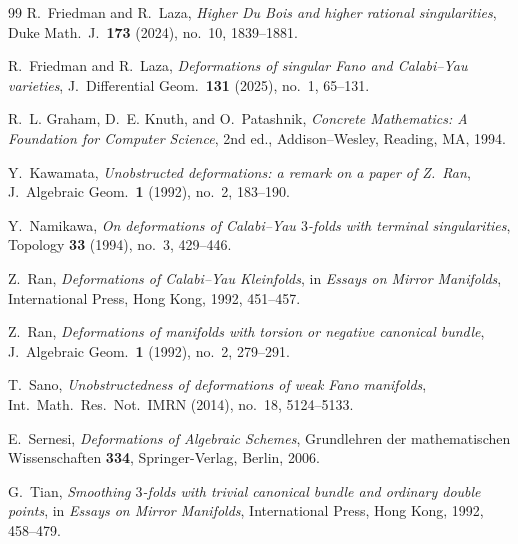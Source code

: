 \documentclass[11pt]{amsart}
\numberwithin{equation}{section}
\theoremstyle{plain}
\theoremstyle{definition}
\newcommand{\0}{$0$-mutable}
\renewcommand{\1}{$1$-rigid}
\renewcommand{\0}{$0$-mutable}
\begin{document}
\begin{thebibliography}{99}
R.~Friedman and R.~Laza,
\emph{Higher Du Bois and higher rational singularities},
Duke Math.\ J.\ \textbf{173} (2024), no.~10, 1839--1881.

R.~Friedman and R.~Laza,
\emph{Deformations of singular Fano and Calabi--Yau varieties},
J.\ Differential Geom.\ \textbf{131} (2025), no.~1, 65--131.

{R.~L. Graham, D.~E. Knuth, and O.~Patashnik,
\emph{Concrete Mathematics: A Foundation for Computer Science},
2nd ed., Addison--Wesley, Reading, MA, 1994.}

Y.~Kawamata,
\emph{Unobstructed deformations: a remark on a paper of Z.~Ran},
J.\ Algebraic Geom.\ \textbf{1} (1992), no.~2, 183--190.






Y.~Namikawa,
\emph{On deformations of Calabi--Yau \(3\)-folds with terminal
singularities},
Topology \textbf{33} (1994), no.~3, 429--446.

Z.~Ran,
\emph{Deformations of Calabi--Yau Kleinfolds},
in \emph{Essays on Mirror Manifolds},
International Press, Hong Kong, 1992, 451--457.

Z.~Ran,
\emph{Deformations of manifolds with torsion or negative canonical
bundle},
J.\ Algebraic Geom.\ \textbf{1} (1992), no.~2, 279--291.

T.~Sano,
\emph{Unobstructedness of deformations of weak Fano manifolds},
Int.\ Math.\ Res.\ Not.\ IMRN (2014), no.~18, 5124--5133.

E.~Sernesi,
\emph{Deformations of Algebraic Schemes},
Grundlehren der mathematischen Wissenschaften \textbf{334},
Springer-Verlag, Berlin, 2006.

G.~Tian,
\emph{Smoothing \(3\)-folds with trivial canonical bundle and ordinary
double points},
in \emph{Essays on Mirror Manifolds},
International Press, Hong Kong, 1992, 458--479.

\end{thebibliography}
\end{document}
